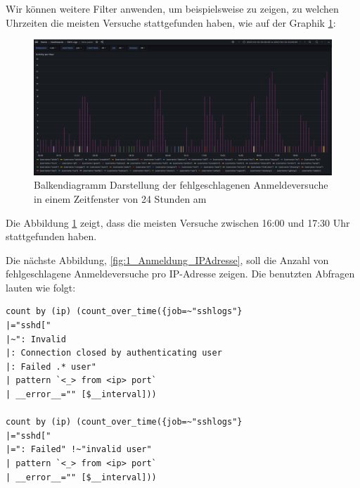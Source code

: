 \newpage
{}
\thispagestyle{lscape}
\begin{landscape}
  Wir können weitere Filter anwenden, um beispielsweise zu zeigen, zu welchen Uhrzeiten die meisten Versuche stattgefunden haben, wie auf der Graphik \ref{fig:2_Anmeldung_BenutzerName}:
    \begin{figure}[H]
        \centerline{\includegraphics[width=1.5\textwidth]{assets/activityperhour.png}}
        \caption[Balkendiagramm Darstellung der fehlgeschlagenen Anmeldeversuche in einem Zeitfenster von 24 Stunden am ]
        {Balkendiagramm Darstellung der fehlgeschlagenen Anmeldeversuche in einem Zeitfenster von 24 Stunden am }
        \label{fig:2_Anmeldung_BenutzerName}
        \centering
    \end{figure}
  Die Abbildung \ref{fig:2_Anmeldung_BenutzerName} zeigt, dass die meisten Versuche zwischen 16:00 und 17:30 Uhr stattgefunden haben.
\end{landscape}
\restoregeometry


Die nächste Abbildung, \ref{fig:1_Anmeldung_IPAdresse}, soll die Anzahl von fehlgeschlagene Anmeldeversuche pro IP-Adresse zeigen. Die benutzten Abfragen lauten wie folgt:
{
\begin{Verbatim}[frame=single]
count by (ip) (count_over_time({job=~"sshlogs"} 
|="sshd[" 
|~": Invalid
|: Connection closed by authenticating user
|: Failed .* user" 
| pattern `<_> from <ip> port` 
| __error__="" [$__interval]))

count by (ip) (count_over_time({job=~"sshlogs"} 
|="sshd[" 
|=": Failed" !~"invalid user" 
| pattern `<_> from <ip> port` 
| __error__="" [$__interval]))
\end{Verbatim}
}


